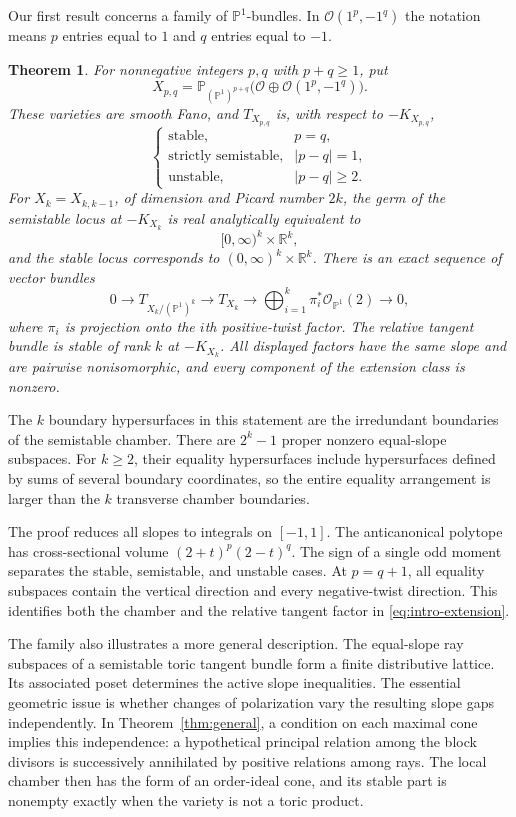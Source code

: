 \documentclass[11pt]{amsart}
\newtheorem{theorem}{Theorem}[section]
\theoremstyle{definition}
\theoremstyle{remark}
\newcommand{\PP}{\mathbb P}
\newcommand{\RR}{\mathbb R}
\begin{document}
Our first result concerns a family of $\PP^1$-bundles. In
$\mathcal O(1^p,-1^q)$ the notation means $p$ entries equal to $1$
and $q$ entries equal to $-1$.

\begin{theorem}\label{thm:family}
For nonnegative integers $p,q$ with $p+q\ge1$, put
\[
 X_{p,q}=\PP_{(\PP^1)^{p+q}}
       \bigl(\mathcal O\oplus\mathcal O(1^p,-1^q)\bigr).
\]
These varieties are smooth Fano, and $T_{X_{p,q}}$ is, with respect to
$-K_{X_{p,q}}$,
\[
 \begin{cases}
 \text{stable},&p=q,\\
 \text{strictly semistable},&|p-q|=1,\\
 \text{unstable},&|p-q|\ge2.
 \end{cases}
\]
For $X_k=X_{k,k-1}$, of dimension and Picard number $2k$, the germ of
the semistable locus at $-K_{X_k}$ is real analytically equivalent to
\[
 [0,\infty)^k\times\RR^k,
\]
and the stable locus corresponds to $(0,\infty)^k\times\RR^k$.
There is an exact sequence of vector bundles
\begin{equation}\label{eq:intro-extension}
 0\longrightarrow T_{X_k/(\PP^1)^k}\longrightarrow T_{X_k}
 \longrightarrow\bigoplus_{i=1}^k\pi_i^*\mathcal O_{\PP^1}(2)
 \longrightarrow0,
\end{equation}
where $\pi_i$ is projection onto the $i$th positive-twist factor.
The relative tangent bundle is stable of rank $k$ at $-K_{X_k}$.
All displayed factors have the same slope and are pairwise nonisomorphic,
and every component of the extension class is nonzero.
\end{theorem}

The $k$ boundary hypersurfaces in this statement are the irredundant
boundaries of the semistable chamber. There are $2^k-1$ proper nonzero
equal-slope subspaces. For $k\ge2$, their equality hypersurfaces include hypersurfaces
defined by sums of several boundary coordinates, so the entire equality arrangement is
larger than the $k$ transverse chamber boundaries.

The proof reduces all slopes to integrals on $[-1,1]$. The anticanonical
polytope has cross-sectional volume
$(2+t)^p(2-t)^q$. The sign of a single odd moment separates the stable,
semistable, and unstable cases. At $p=q+1$, all equality subspaces contain
the vertical direction and every negative-twist direction. This identifies
both the chamber and the relative tangent factor in
\eqref{eq:intro-extension}.

The family also illustrates a more general description. The equal-slope
ray subspaces of a semistable toric tangent bundle form a finite
distributive lattice. Its associated poset determines the active slope
inequalities. The essential geometric issue is whether changes of
polarization vary the resulting slope gaps independently. In
Theorem~\ref{thm:general}, a condition on each maximal cone implies this
independence: a hypothetical principal relation among the block divisors
is successively annihilated by positive relations among rays. The local
chamber then has the form of an order-ideal cone, and its stable part is
nonempty exactly when the variety is not a toric product.
\end{document}
